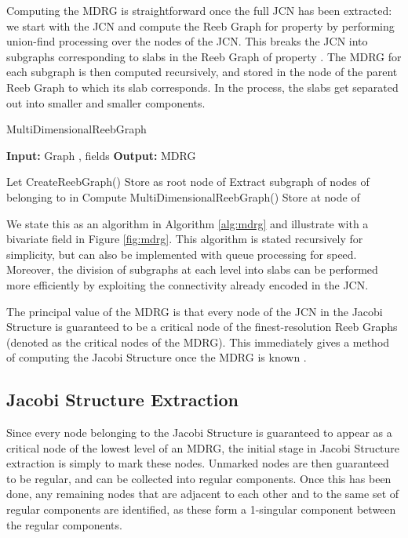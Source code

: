 \documentclass[twocolumn]{article}
\newcommand{\figref}[1]{Figure \ref{fig:#1}}
\newcommand{\algoref}[1]{Algorithm \ref{alg:#1}}
\begin{document}
Computing the MDRG is straightforward once the full JCN has been extracted: we 
start with the JCN and compute the Reeb Graph for property  by performing
union-find processing over the nodes of the JCN.  This breaks the JCN into subgraphs
corresponding to slabs in the Reeb Graph of property . The MDRG for each 
subgraph is then computed recursively, and stored in the node of the parent Reeb 
Graph to which its slab corresponds. In the process, the slabs get separated out into 
smaller and smaller components.

\begin{algorithm}
\caption{{\sc MultiDimensionalReebGraph}}
\label{alg:mdrg}
{\bf Input:} Graph , fields 
{\bf Output:} MDRG 
\begin{algorithmic}[1]
\If {}
\State	Let  CreateReebGraph() 
\State Store  as root node of 
\State Extract subgraph  of nodes of  belonging to  in  
\State Compute  \small{MultiDimensionalReebGraph()}
\State	Store  at node  of 
\EndFor
\State \Return 
\Else
\State \Return 
\EndIf
\end{algorithmic}
\end{algorithm}

We state this as an algorithm in \algoref{mdrg} and illustrate with a bivariate
field in \figref{mdrg}.   This algorithm is stated recursively for simplicity, but can also
be implemented with queue processing for speed. Moreover, the division of subgraphs
at each level into slabs can be performed more efficiently by exploiting the connectivity 
already encoded in the JCN.  

The principal value of the MDRG is that every node of the JCN in the Jacobi Structure is
guaranteed to be a critical node of the finest-resolution Reeb
Graphs (denoted as the critical nodes of the MDRG). This immediately gives a method of computing the Jacobi Structure once the MDRG
is known \cite{2014-EuroVis-short}.

\subsection{Jacobi Structure Extraction}
\label{sec:JacobiStructureExtraction}
Since every node belonging to the Jacobi Structure is guaranteed to appear as a critical node
of the lowest level of an MDRG, the initial stage in Jacobi Structure extraction is simply to
mark these nodes.  Unmarked nodes are then guaranteed to be regular, and can be collected
into regular components.  Once this has been done, any remaining nodes that are adjacent
to each other and to the same set of regular components are identified, as these form a 
 1-singular component between the regular components.
\end{document}
